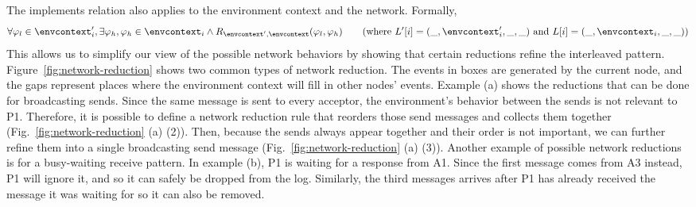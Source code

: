 

The implements relation also applies to the environment context and the network.
Formally,
$$\forall \varphi_l \in \envcontext'_i, \exists \varphi_h,  \varphi_h \in \envcontext_i \wedge R_{\envcontext', \envcontext}(\varphi_l , \varphi_h) \ \ \ \ \ \ (\mbox{where} \ L'[i] = (\_,  \envcontext'_i, \_, \_) \ \mbox{and} \
L[i] = (\_,  \envcontext_i, \_, \_))$$
This allows us to simplify our view of the possible network behaviors by showing that certain reductions refine the interleaved pattern.
Figure~\ref{fig:network-reduction} shows two common types of network reduction.
The events in boxes are generated by the current node, and the gaps represent places where the environment context will fill in other nodes' events.
Example (a) shows the reductions that can be done for broadcasting sends.
Since the same message is sent to every acceptor, the environment's behavior between the sends is not relevant to P1.
Therefore, it is possible to define a network reduction rule that reorders those send messages and collects them together (Fig.~\ref{fig:network-reduction} (a) (2)).
Then, because the sends always appear together and their order is not important, we can further refine them into a single broadcasting send message (Fig.~\ref{fig:network-reduction} (a) (3)).
Another example of possible network reductions is for a busy-waiting receive pattern.
In example (b), P1 is waiting for a response from A1.
Since the first message comes from A3 instead, P1 will ignore it, and so it can safely be dropped from the log.
Similarly, the third messages arrives after P1 has already received the message it was waiting for so it can also be removed.



